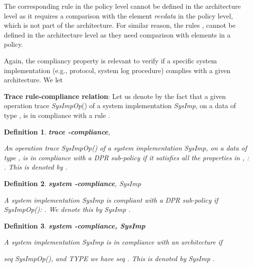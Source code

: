 \documentclass[a4paper]{article}
\newtheorem{ttd}{Definition}
\begin{document}
The corresponding rule  in the policy level cannot be defined in the architecture level as it requires a comparison with the element \textit{revdata} in the policy level, which is not part of the architecture. For similar reason, the rules ,  cannot be defined in the architecture level as they need comparison with elements in a policy.



Again, the  compliancy property is relevant to verify if a specific system implementation (e.g., protocol, system log procedure) complies with a given architecture. We let 

\begin{center}
\noindent\fbox{\parbox{6.2cm}{\ \ \ \  = \{, , , , , , \}
     }
}
\end{center} 

\noindent \textbf{Trace rule-compliance relation}: Let us denote by    the fact that a given operation trace   \textit{SysImpOp}() of a system implementation \textit{SysImp}, on a data of type , is in compliance with a rule   .  


\begin{ttd}\textbf{trace -compliance},   

\noindent An operation trace   \textit{SysImpOp}() of a system implementation \textit{SysImp}, on a data of type , is in compliance with a DPR sub-policy  if it satisfies all the properties in ,   :   .  This is denoted by   .  
\end{ttd} 

 
\begin{ttd}\textbf{system -compliance}, \textit{SysImp}  

\noindent A system implementation \textit{SysImp} is compliant with a DPR sub-policy  if   \textit{SysImpOp}():   .  We denote this by \textit{SysImp}  .   
\end{ttd} 


\begin{ttd}\textbf{system -compliance, \textit{SysImp}  }

\noindent A system implementation \textit{SysImp} is in compliance with an architecture  if 

 \textit{seq}  \textit{SysImpOp()}, and    \textit{TYPE}  we have \textit{seq}  . This is denoted by \textit{SysImp}  .   
\end{ttd}
\end{document}

